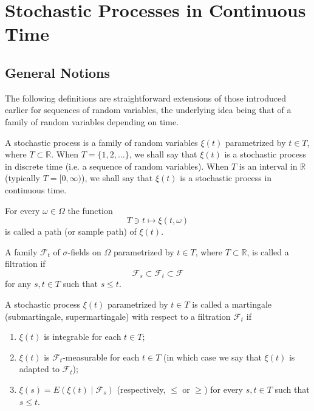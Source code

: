 \chapter{Stochastic Processes in Continuous Time}
\label{chap:stochastic-processes-continuous-time}

\section{General Notions}
\label{sec:general-notions}

The following definitions are straightforward extensions of those introduced earlier for sequences of random variables, the underlying idea being that of a family of random variables depending on time.

\begin{Definition}
\label{def:stochastic-process}
A stochastic process is a family of random variables $\xi(t)$ parametrized by $t \in T$, where $T \subset \mathbb{R}$. When $T = \{1, 2, \ldots\}$, we shall say that $\xi(t)$ is a stochastic process in discrete time (i.e. a sequence of random variables). When $T$ is an interval in $\mathbb{R}$ (typically $T = [0, \infty)$), we shall say that $\xi(t)$ is a stochastic process in continuous time.
\end{Definition}

For every $\omega \in \Omega$ the function
\[
T \ni t \mapsto \xi(t, \omega)
\]
is called a path (or sample path) of $\xi(t)$.

\begin{Definition}[Filtration]
\label{def:filtration}
A family $\mathcal{F}_t$ of $\sigma$-fields on $\Omega$ parametrized by $t \in T$, where $T \subset \mathbb{R}$, is called a filtration if
\[
\mathcal{F}_s \subset \mathcal{F}_t \subset \mathcal{F}
\]
for any $s, t \in T$ such that $s \leq t$.
\end{Definition}

\begin{Definition}[Martingale]
\label{def:martingale}
A stochastic process $\xi(t)$ parametrized by $t \in T$ is called a martingale (submartingale, supermartingale) with respect to a filtration $\mathcal{F}_t$ if
\begin{enumerate}
\item $\xi(t)$ is integrable for each $t \in T$;
\item $\xi(t)$ is $\mathcal{F}_t$-measurable for each $t \in T$ (in which case we say that $\xi(t)$ is adapted to $\mathcal{F}_t$);
\item $\xi(s) = E(\xi(t) \mid \mathcal{F}_s)$ (respectively, $\leq$ or $\geq$) for every $s, t \in T$ such that $s \leq t$.
\end{enumerate}
\end{Definition}

